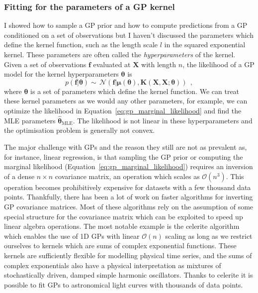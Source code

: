 \documentclass[12pt,dvipsnames]{report}
\newcommand{\ssf}[1]{\textsf{#1}}
\renewcommand{\vec}[1]{\boldsymbol{\mathbf{#1}}}
\newcommand{\hquad}{~~}
\begin{document}
\subsubsection{Fitting for the parameters of a GP kernel}
I showed how to sample a GP prior and how to compute predictions from a GP
conditioned on a set of observations but I haven't discussed the parameters
which define the kernel function, such as the length scale $l$ in the squared
exponential kernel. These parameters are often called the
\emph{hyperparameters} of the kernel. Given a set of observations $\vec{f}$
evaluated at $\vec{X}$ with length $n$, the likelihood of a GP model for the
kernel hyperparameters $\vec{\theta}$ is
\begin{equation}
    p(\vec{f}\lvert \vec{\theta})\sim\,
    \mathcal{N}(\vec{f}\lvert \vec{\mu}(\vec{\theta}),
    \vec{K}(\vec X, \vec X; \vec\theta))
    \hquad,
    \label{eq:gp_marginal_likelihood}
\end{equation}
where $\vec{\theta}$ is a set of parameters which define the kernel function. We
can treat these kernel parameters as we would any other parameters, for example, we
can optimize the likelihood in Equation~\ref{eq:gp_marginal_likelihood} and find the
MLE parameters $\hat{\vec{\theta}}_\mathrm{MLE}$. The likelihood is not linear in these
hyperparameters and the optimisation problem is generally not convex.

The major challenge with GPs and the reason they still are not as prevalent as, for
instance, linear regression, is that sampling the GP prior or computing the
marginal likelihood (Equation~\ref{eq:gp_marginal_likelihood}) requires an
inversion of a dense $n\times n$ covariance matrix, an operation which scales
as $\mathcal{O}(n^3)$. This operation becomes prohibitively expensive for
datasets with a few thousand data points. Thankfully, there has been a lot of
work on faster algorithms for inverting GP covariance matrices. Most of these
algorithms rely on the assumption of some special structure for the covariance
matrix which can be exploited to speed up linear algebra operations. The
most notable example is the \ssf{celerite} algorithm
\citep{2017AJ....154..220F} which enables the use of 1D GPs with linear
$\mathcal{O}(n)$ scaling as long as we restrict ourselves to kernels which are
sums of complex exponential functions. These kernels are sufficiently flexible
for modelling physical time series, and the sums of complex exponentials also
have a physical interpretation as mixtures of stochastically driven, damped
simple harmonic oscillators. Thanks to \ssf{celerite} it is possible to fit
GPs to astronomical light curves with thousands of data points.
\end{document}
